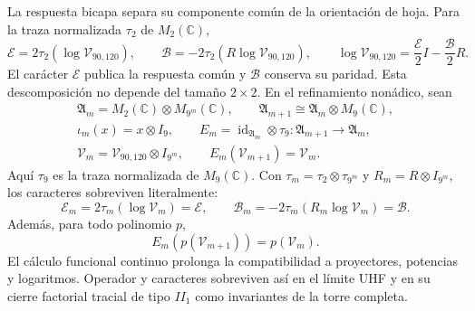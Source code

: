 La respuesta bicapa separa su componente común de la orientación de hoja.
Para la traza normalizada \(\tau_2\) de \(M_2(\mathbb C)\),
\begin{equation}
\boxed{
\mathcal E=2\tau_2(\log\mathcal V_{90,120}),\qquad
\mathcal B=-2\tau_2(R\log\mathcal V_{90,120}),\qquad
\log\mathcal V_{90,120}
=\frac{\mathcal E}{2}I-\frac{\mathcal B}{2}R.}
\label{p3-83-c31-s2:eq:vacuum-log-characters}
\end{equation}
El carácter \(\mathcal E\) publica la respuesta común y \(\mathcal B\)
conserva su paridad. Esta descomposición no depende del tamaño
\(2\times2\). En el refinamiento nonádico, sean
\begin{equation}
\begin{gathered}
\mathfrak A_m=M_2(\mathbb C)\otimes M_{9^m}(\mathbb C),\qquad
\mathfrak A_{m+1}\cong\mathfrak A_m\otimes M_9(\mathbb C),\\
\iota_m(x)=x\otimes I_9,\qquad
E_m=\operatorname{id}_{\mathfrak A_m}\otimes\tau_9:
\mathfrak A_{m+1}\longrightarrow\mathfrak A_m,\\
\mathcal V_m=\mathcal V_{90,120}\otimes I_{9^m},\qquad
E_m(\mathcal V_{m+1})=\mathcal V_m.
\end{gathered}
\label{p3-83-c31-s2:eq:vacuum-uhf-tower}
\end{equation}
Aquí \(\tau_9\) es la traza normalizada de \(M_9(\mathbb C)\). Con
\(\tau_m=\tau_2\otimes\tau_{9^m}\) y
\(R_m=R\otimes I_{9^m}\), los caracteres sobreviven literalmente:
\begin{equation}
\mathcal E_m=2\tau_m(\log\mathcal V_m)=\mathcal E,
\qquad
\mathcal B_m=-2\tau_m(R_m\log\mathcal V_m)=\mathcal B.
\label{p3-83-c31-s2:eq:vacuum-uhf-characters}
\end{equation}
Además, para todo polinomio \(p\),
\begin{equation}
E_m\!\left(p(\mathcal V_{m+1})\right)=p(\mathcal V_m).
\label{p3-83-c31-s2:eq:vacuum-conditional-polynomial}
\end{equation}
El cálculo funcional continuo prolonga la compatibilidad a proyectores,
potencias y logaritmos. Operador y caracteres sobreviven así en el límite
UHF y en su cierre factorial tracial de tipo \(II_1\) como invariantes de la
torre completa.
